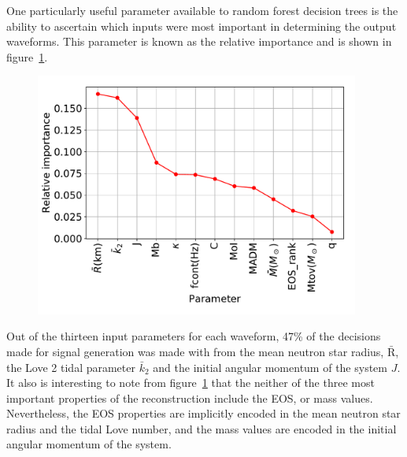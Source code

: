 One particularly useful parameter available to random forest decision trees is the ability to ascertain which inputs were most important in determining the output waveforms. This parameter is known as the relative importance and is shown in figure~\ref{fig:RFRelativeLabelImportance}. 
\begin{figure}[H]
		\centering
		\includegraphics[height=8.0cm]{./img/RFRelativeLabelImportance.pdf} 
		\caption[\protect]{\protect}
		\label{fig:RFRelativeLabelImportance}
\end{figure}
Out of the thirteen input parameters for each waveform, 47\% of the decisions made for signal generation was made with from the mean neutron star radius, $\bar{\text{R}}$, the Love 2 tidal parameter $\bar{k}_2$ and the initial angular momentum of the system $J$. It also is interesting to note from figure~\ref{fig:RFRelativeLabelImportance} that the neither of the three most important properties of the reconstruction include the EOS, or mass values. Nevertheless, the EOS properties are implicitly encoded in the mean neutron star radius and the tidal Love number, and the mass values are encoded in the initial angular momentum of the system.
